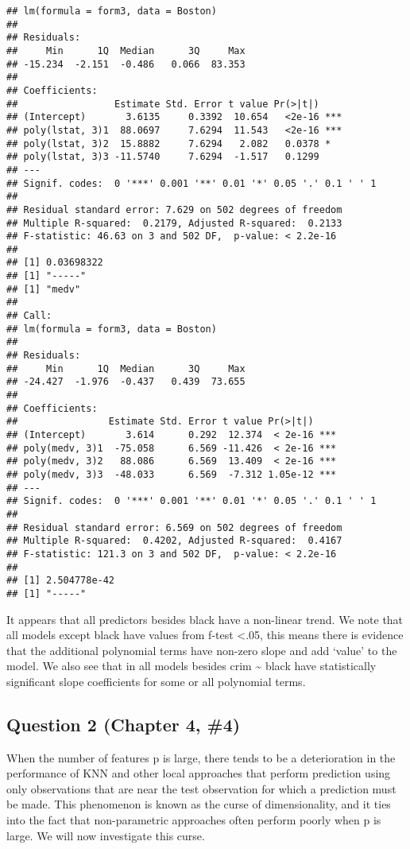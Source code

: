 \documentclass[]{article}
\begin{document}
\begin{verbatim}
## lm(formula = form3, data = Boston)
## 
## Residuals:
##     Min      1Q  Median      3Q     Max 
## -15.234  -2.151  -0.486   0.066  83.353 
## 
## Coefficients:
##                 Estimate Std. Error t value Pr(>|t|)    
## (Intercept)       3.6135     0.3392  10.654   <2e-16 ***
## poly(lstat, 3)1  88.0697     7.6294  11.543   <2e-16 ***
## poly(lstat, 3)2  15.8882     7.6294   2.082   0.0378 *  
## poly(lstat, 3)3 -11.5740     7.6294  -1.517   0.1299    
## ---
## Signif. codes:  0 '***' 0.001 '**' 0.01 '*' 0.05 '.' 0.1 ' ' 1
## 
## Residual standard error: 7.629 on 502 degrees of freedom
## Multiple R-squared:  0.2179, Adjusted R-squared:  0.2133 
## F-statistic: 46.63 on 3 and 502 DF,  p-value: < 2.2e-16
## 
## [1] 0.03698322
## [1] "-----"
## [1] "medv"
## 
## Call:
## lm(formula = form3, data = Boston)
## 
## Residuals:
##     Min      1Q  Median      3Q     Max 
## -24.427  -1.976  -0.437   0.439  73.655 
## 
## Coefficients:
##                Estimate Std. Error t value Pr(>|t|)    
## (Intercept)       3.614      0.292  12.374  < 2e-16 ***
## poly(medv, 3)1  -75.058      6.569 -11.426  < 2e-16 ***
## poly(medv, 3)2   88.086      6.569  13.409  < 2e-16 ***
## poly(medv, 3)3  -48.033      6.569  -7.312 1.05e-12 ***
## ---
## Signif. codes:  0 '***' 0.001 '**' 0.01 '*' 0.05 '.' 0.1 ' ' 1
## 
## Residual standard error: 6.569 on 502 degrees of freedom
## Multiple R-squared:  0.4202, Adjusted R-squared:  0.4167 
## F-statistic: 121.3 on 3 and 502 DF,  p-value: < 2.2e-16
## 
## [1] 2.504778e-42
## [1] "-----"
\end{verbatim}

It appears that all predictors besides black have a non-linear trend. We
note that all models except black have values from f-test
\textless{}.05, this means there is evidence that the additional
polynomial terms have non-zero slope and add `value' to the model. We
also see that in all models besides crim \textasciitilde{} black have
statistically significant slope coefficients for some or all polynomial
terms.

\hypertarget{question-2-chapter-4-4}{%
\subsection{Question 2 (Chapter 4, \#4)}\label{question-2-chapter-4-4}}

When the number of features p is large, there tends to be a
deterioration in the performance of KNN and other local approaches that
perform prediction using only observations that are near the test
observation for which a prediction must be made. This phenomenon is
known as the curse of dimensionality, and it ties into the fact that
non-parametric approaches often perform poorly when p is large. We will
now investigate this curse.
\end{document}
